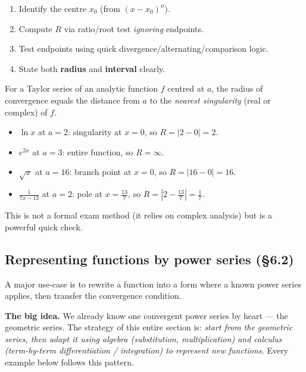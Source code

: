 \begin{examtip}[title={Exam Focus: a fast workflow for $R$}]
\begin{enumerate}[leftmargin=*]
\item Identify the centre $x_0$ (from $(x-x_0)^n$).
\item Compute $R$ via ratio/root test \emph{ignoring} endpoints.
\item Test endpoints using quick divergence/alternating/comparison logic.
\item State both \textbf{radius} and \textbf{interval} clearly.
\end{enumerate}
\end{examtip}

\begin{examtip}[title={Exam Shortcut: radius from nearest singularity (Tutorial~12, Q1 Method~2)}]
For a Taylor series of an analytic function $f$ centred at $a$,
the radius of convergence equals the distance from $a$ to the \emph{nearest singularity}
(real or complex) of $f$.
\begin{itemize}[leftmargin=*]
\item $\ln x$ at $a=2$: singularity at $x=0$, so $R=|2-0|=2$.
\item $e^{2x}$ at $a=3$: entire function, so $R=\infty$.
\item $\sqrt{x}$ at $a=16$: branch point at $x=0$, so $R=|16-0|=16$.
\item $\frac{1}{7x-13}$ at $a=2$: pole at $x=\frac{13}{7}$, so $R=\left|2-\frac{13}{7}\right|=\frac{1}{7}$.
\end{itemize}
This is not a formal exam method (it relies on complex analysis) but is a powerful quick check.
\end{examtip}

\subsection{Representing functions by power series (\S6.2)}

A major use-case is to rewrite a function into a form where a known power series applies, then transfer the convergence condition.

\noindent\textbf{The big idea.}
We already know one convergent power series by heart --- the geometric series.
The strategy of this entire section is:
\emph{start from the geometric series, then adapt it using algebra (substitution, multiplication) and calculus (term-by-term differentiation / integration) to represent new functions.}
Every example below follows this pattern.


